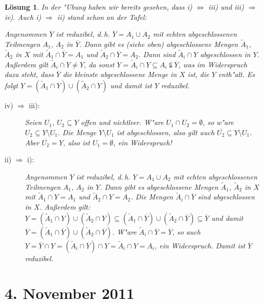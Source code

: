 \documentclass[a4paper, 12pt, numbers=noendperiod, chapterprefix=true, headsepline]{scrbook}
\theoremstyle{break}
\newtheorem{Loes}{L\"osung}
\theoremstyle{nonumberbreak}
\theoremstyle{nonumberplain}
\begin{document}
\begin{Loes}
In der "Ubung haben wir bereits gesehen, dass i) $\Leftrightarrow$ iii) und iii) $\Rightarrow$ iv). 
Auch i) $\Rightarrow$ ii) stand schon an der Tafel:

Angenommen $\overline{Y}$ ist reduzibel, d.\,h. $\overline{Y} = A_1 \cup A_2$ mit echten abgeschlossenen Teilmengen $A_1$, $A_2$ in $\overline{Y}$. Dann gibt es (siehe oben) abgeschlossene Mengen $\tilde{A}_1$, $\tilde{A}_2$ in $X$ mit $\tilde{A}_1 \cap \overline{Y} = A_1$ und $\tilde{A}_2 \cap \overline{Y} = A_2$. Dann sind $\tilde{A}_i \cap Y$ abgeschlossen in $Y$. Au\ss erdem gilt $\tilde{A}_i \cap Y \neq Y$, da sonst $Y = \tilde{A}_i \cap Y \subseteq A_i \subsetneqq \overline{Y}$, was im Widerspruch dazu steht, dass $\overline{Y}$ die kleinste abgeschlossene Menge in $X$ ist, die $Y$ enth"alt. Es folgt $Y = (\tilde{A}_1 \cap Y) \cup (\tilde{A}_2 \cap Y)$ und damit ist $Y$ reduzibel.
\begin{description}
\item[iv) $\Rightarrow$ iii):]
	Seien $U_1$, $U_2 \subseteq Y$ offen und nichtleer. W"are $U_1\cap U_2= \emptyset$, so w"are $U_2 \subseteq Y\setminus U_1$. Die Menge $Y\setminus U_1$ ist abgeschlossen, also gilt auch $\overline{U_2}\subseteq Y\setminus U_1$. Aber $\overline{U_2}= Y$, also ist $U_1 =\emptyset$, ein Widerspruch!
\item[ii) $\Rightarrow$ i):]
	Angenommen $Y$ ist reduzibel, d.\,h. $Y = A_1 \cup A_2$ mit echten abgeschlossenen Teilmengen $A_1$, $A_2$ in $Y$. Dann gibt es abgeschlossene Mengen $\tilde{A}_1$, $\tilde{A}_2$ in $X$ mit $\tilde{A}_1 \cap Y = A_1$ und $\tilde{A}_2 \cap Y = A_2$. Die Mengen $\tilde{A}_i \cap \overline{Y}$ sind abgeschlossen in $X$. Au\ss erdem gilt: $Y = (\tilde{A}_1 \cap Y) \cup (\tilde{A}_2 \cap Y) \subseteq (\tilde{A}_1 \cap \overline{Y}) \cup (\tilde{A}_2 \cap \overline{Y}) \subseteq \overline{Y}$ und damit $\overline{Y} = (\tilde{A}_1 \cap \overline{Y}) \cup (\tilde{A}_2 \cap \overline{Y})$. W"are $\tilde{A}_i \cap \overline{Y} = \overline{Y}$, so auch $Y = \overline{Y} \cap Y = (\tilde{A}_i \cap \overline{Y}) \cap Y = \tilde{A}_i \cap Y = A_i$, ein Widerspruch. Damit ist $\overline{Y}$ reduzibel.
\end{description}\end{Loes}

\newpage
\section{4. November 2011}
\setcounter{Aufg}{0}
\setcounter{Loes}{0}
\end{document}
